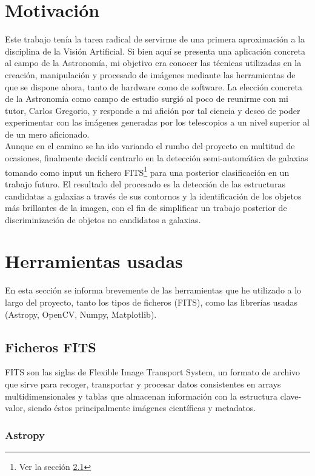 \documentclass[a4paper,12pt]{article}
\begin{document}
\section{Motivación}
Este trabajo tenía la tarea radical de servirme de una primera aproximación a la disciplina de la Visión Artificial. Si bien aquí se presenta una aplicación concreta al campo de la Astronomía, mi objetivo era conocer las técnicas utilizadas en la creación, manipulación y procesado de imágenes mediante las herramientas de que se dispone ahora, tanto de hardware como de software. La elección concreta de la Astronomía como campo de estudio surgió al poco de reunirme con mi tutor, Carlos Gregorio, y responde a mi afición por tal ciencia y deseo de poder experimentar con las imágenes generadas por los telescopios a un nivel superior al de un mero aficionado.
\\
Aunque en el camino se ha ido variando el rumbo del proyecto en multitud de ocasiones, finalmente decidí centrarlo en la detección semi-automática de galaxias tomando como input un fichero FITS\footnote{Ver la sección \ref{sec:FITS}} para una posterior clasificación en un trabajo futuro. El resultado del procesado es la detección de las estructuras candidatas a galaxias a través de sus contornos y la identificación de los objetos más brillantes de la imagen, con el fin de simplificar un trabajo posterior de discriminización de objetos no candidatos a galaxias.


\section{Herramientas usadas}

En esta sección se informa brevemente de las herramientas que he utilizado a lo largo del proyecto, tanto los tipos de ficheros (FITS), como las librerías usadas (Astropy, OpenCV, Numpy, Matplotlib).
\subsection{Ficheros FITS}
\label{sec:FITS}

FITS son las siglas de Flexible Image Transport System, un formato de archivo que sirve para recoger, transportar y procesar datos consistentes en arrays multidimensionales y tablas que almacenan información con la estructura clave-valor, siendo éstos principalmente imágenes científicas y metadatos.
\subsubsection{Astropy}
\end{document}
